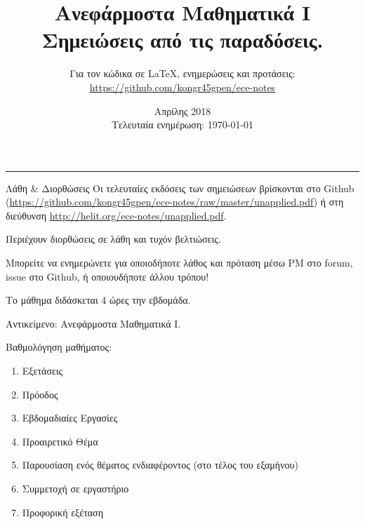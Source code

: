 \documentclass[11pt,a4paper,notitlepage,fleqn,final]{article}
\title{Ανεφάρμοστα Μαθηματικά I
	\\
	{ 
		\normalsize Σημειώσεις από τις παραδόσεις.}
	}
\date{Απρίλης 2018
	\\
	{ 
		\small Τελευταία ενημέρωση: \today
	}
}
\author{
	Για τον κώδικα σε \LaTeX, ενημερώσεις και προτάσεις:
	\\
	\url{https://github.com/kongr45gpen/ece-notes}}
\begin{document}
\maketitle

\hrule
\vspace{50pt}

\begin{infobox}{Λάθη \& Διορθώσεις}
	Οι τελευταίες εκδόσεις των σημειώσεων βρίσκονται στο Github
	(\url{https://github.com/kongr45gpen/ece-notes/raw/master/unapplied.pdf}) ή
	στη διεύθυνση \url{http://helit.org/ece-notes/unapplied.pdf}.
	
	Περιέχουν διορθώσεις σε λάθη και τυχόν βελτιώσεις.
	
	\tcblower
	
	Μπορείτε να ενημερώνετε για οποιοδήποτε λάθος και πρόταση
	μέσω PM στο forum, issue στο Github, ή οποιουδήποτε άλλου τρόπου!
\end{infobox}

Το μάθημα διδάσκεται 4 ώρες την εβδομάδα.

Αντικείμενο: Ανεφάρμοστα Μαθηματικά I.

Βαθμολόγηση μαθήματος:
\begin{enumerate}
	\item Εξετάσεις
	\item Πρόοδος
	\item Εβδομαδιαίες Εργασίες
	\item Προαιρετικό Θέμα
	\item Παρουσίαση ενός θέματος ενδιαφέροντος (στο τέλος του εξαμήνου)
	\item Συμμετοχή σε εργαστήριο
	\item Προφορική εξέταση
\end{enumerate}
\end{document}
